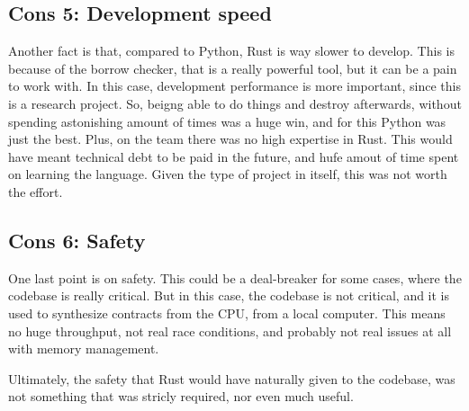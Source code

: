 \subsection[Development speed]{Cons 5: Development speed}
Another fact is that, compared to Python, Rust is way slower to develop. This is
because of the borrow checker, that is a really powerful tool, but it can be a
pain to work with. In this case, development performance is more important, since
this is a research project. So, beigng able to do things and destroy afterwards,
without spending astonishing amount of times was a huge win, and for this Python
was just the best. Plus, on the team there was no high expertise in Rust. This
would have meant technical debt to be paid in the future, and hufe amout of time
spent on learning the language. Given the type of project in itself, this was not
worth the effort.

\subsection[Safety]{Cons 6: Safety}
One last point is on safety. This could be a deal-breaker for some cases, where the
codebase is really critical. But in this case, the codebase is not critical, and
it is used to synthesize contracts from the CPU, from a local computer. This
means no huge throughput, not real race conditions, and probably not real issues
at all with memory management.

Ultimately, the safety that Rust would have naturally given to the codebase, was
not something that was stricly required, nor even much useful.